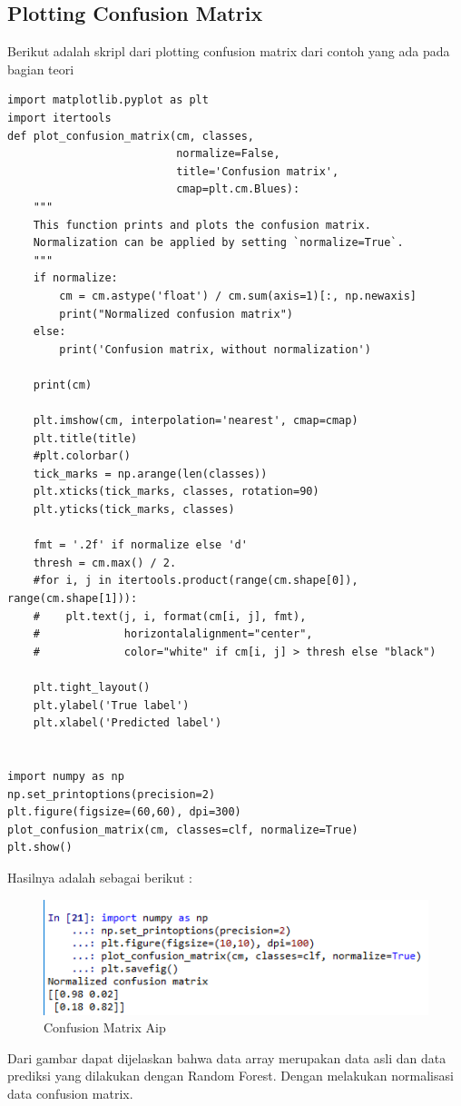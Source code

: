 \subsection{Plotting Confusion Matrix}
Berikut adalah skripl dari plotting confusion matrix dari contoh yang ada pada bagian teori
\begin{verbatim}
import matplotlib.pyplot as plt
import itertools
def plot_confusion_matrix(cm, classes,
                          normalize=False,
                          title='Confusion matrix',
                          cmap=plt.cm.Blues):
    """
    This function prints and plots the confusion matrix.
    Normalization can be applied by setting `normalize=True`.
    """
    if normalize:
        cm = cm.astype('float') / cm.sum(axis=1)[:, np.newaxis]
        print("Normalized confusion matrix")
    else:
        print('Confusion matrix, without normalization')

    print(cm)

    plt.imshow(cm, interpolation='nearest', cmap=cmap)
    plt.title(title)
    #plt.colorbar()
    tick_marks = np.arange(len(classes))
    plt.xticks(tick_marks, classes, rotation=90)
    plt.yticks(tick_marks, classes)

    fmt = '.2f' if normalize else 'd'
    thresh = cm.max() / 2.
    #for i, j in itertools.product(range(cm.shape[0]), range(cm.shape[1])):
    #    plt.text(j, i, format(cm[i, j], fmt),
    #             horizontalalignment="center",
    #             color="white" if cm[i, j] > thresh else "black")

    plt.tight_layout()
    plt.ylabel('True label')
    plt.xlabel('Predicted label')
    

import numpy as np
np.set_printoptions(precision=2)
plt.figure(figsize=(60,60), dpi=300)
plot_confusion_matrix(cm, classes=clf, normalize=True)
plt.show()
\end{verbatim}
Hasilnya adalah sebagai berikut :
\begin{figure}[ht]
\centering
\includegraphics[scale=0.5]{figures/AIP/c10.PNG}
\caption{Confusion Matrix Aip}
\label{Praktek}
\end{figure}
Dari gambar dapat dijelaskan bahwa data array merupakan data asli dan data prediksi yang dilakukan dengan Random Forest. Dengan melakukan normalisasi data confusion matrix.

